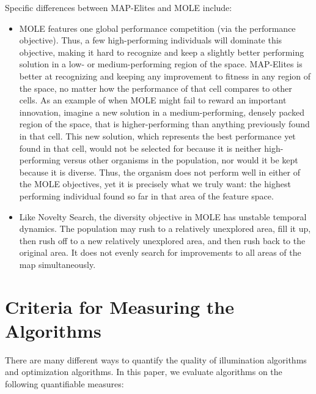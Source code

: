 \documentclass[twocolumn, DIV25, 9pt]{scrartcl}
\newcommand{\todoOfficialVersion}[1]{} %
\begin{document}
Specific differences between MAP-Elites and MOLE include:
\begin{itemize}
\item MOLE features one global performance competition (via the performance objective). Thus, a few high-performing individuals will dominate this objective, making it hard to recognize and keep a slightly better performing solution in a low- or medium-performing region of the space. MAP-Elites is better at recognizing and keeping any improvement to fitness in any region of the space, no matter how the performance of that cell compares to other cells. As an example of when MOLE might fail to reward an important innovation, imagine a new solution in a medium-performing, densely packed region of the space, that is higher-performing than anything previously found in that cell. This new solution, which represents the best performance yet found in that cell, would not be selected for because it is neither high-performing versus other organisms in the population, nor would it be kept because it is diverse. Thus, the organism does not perform well in either of the MOLE objectives, yet it is precisely what we truly want: the highest performing individual found so far in that area of the feature space. 

\item Like Novelty Search, the diversity objective in MOLE has unstable temporal dynamics. The population may rush to a relatively unexplored area, fill it up, then rush off to a new relatively unexplored area, and then rush back to the original area. It does not evenly search for improvements to all areas of the map simultaneously. 

\todoOfficialVersion{add any more? JBM: care to add any?}
\end{itemize} 

\todoOfficialVersion{JBM: Do we need one of these lists for MAP-Elites vs. performance+behavioralDiversity-MOO? How about vs. plain NS?}



\section{Criteria for Measuring the Algorithms}
\label{criteria}
There are many different ways to quantify the quality of illumination algorithms and optimization algorithms. In this paper, we evaluate algorithms on the following quantifiable measures: 
\end{document}
